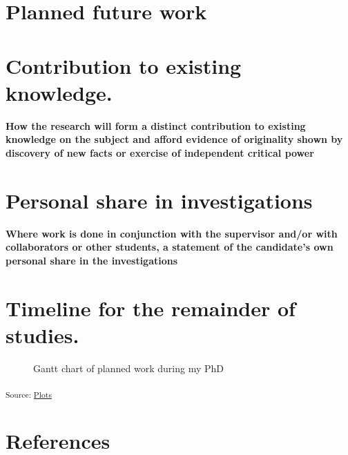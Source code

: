 \documentclass[
  letterpaper,
  DIV=11,
  numbers=noendperiod]{scrartcl}
\begin{document}
\section{Planned future work}\label{planned-future-work}

\section{Contribution to existing
knowledge.}\label{contribution-to-existing-knowledge.}

\textbf{How the research will form a distinct contribution to existing
knowledge on the subject and afford evidence of originality shown by
discovery of new facts or exercise of independent critical power}

\section{Personal share in
investigations}\label{personal-share-in-investigations}

\textbf{Where work is done in conjunction with the supervisor and/or
with collaborators or other students, a statement of the candidate's own
personal share in the investigations}

\section{Timeline for the remainder of
studies.}\label{timeline-for-the-remainder-of-studies.}

\begin{figure}[H]


\caption{\label{fig-gantt-chart}Gantt chart of planned work during my
PhD}

\end{figure}%

\textsubscript{Source:
\href{https://juliam98.github.io/phd-upgrade-proposal/notebooks/plots-preview.html\#cell-fig-gantt-chart}{Plots}}

\newpage{}

\section{References}\label{references}

\printbibliography[heading=none]
\end{document}
